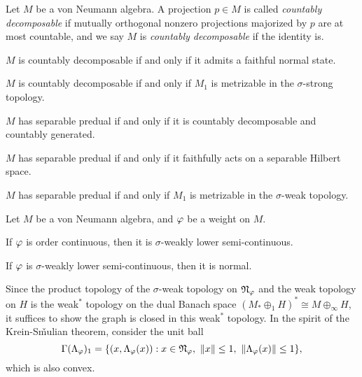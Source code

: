 \documentclass{../../large}
\begin{document}
\begin{prb}
Let $M$ be a von Neumann algebra.
A projection $p\in M$ is called \emph{countably decomposable} if mutually orthogonal nonzero projections majorized by $p$ are at most countable, and we say $M$ is \emph{countably decomposable} if the identity is.

\begin{parts}
\item $M$ is countably decomposable if and only if it admits a faithful normal state.
\item $M$ is countably decomposable if and only if $M_1$ is metrizable in the $\sigma$-strong topology.
\item $M$ has separable predual if and only if it is countably decomposable and countably generated.
\item $M$ has separable predual if and only if it faithfully acts on a separable Hilbert space.
\item $M$ has separable predual if and only if $M_1$ is metrizable in the $\sigma$-weak topology.
\end{parts}
\end{prb}
\begin{pf}
\end{pf}


\begin{prb}
Let $M$ be a von Neumann algebra, and $\varphi$ be a weight on $M$.
\begin{parts}
\item If $\varphi$ is order continuous, then it is $\sigma$-weakly lower semi-continuous.
\item If $\varphi$ is $\sigma$-weakly lower semi-continuous, then it is normal.
\end{parts}
\end{prb}
\begin{pf}
Since the product topology of the $\sigma$-weak topology on $\mathfrak{N}_\varphi$ and the weak topology on $H$ is the weak$^*$ topology on the dual Banach space $(M_*\oplus_1H)^*\cong M\oplus_\infty H$, it suffices to show the graph is closed in this weak$^*$ topology.
In the spirit of the Krein-S\v mulian theorem, consider the unit ball
\[\Gamma(\Lambda_\f)_1=\{(x,\Lambda_\f(x)):x\in\fN_\f,\ \|x\|\le1,\ \|\Lambda_\f(x)\|\le1\},\]
which is also convex.
\end{pf}
\end{document}
